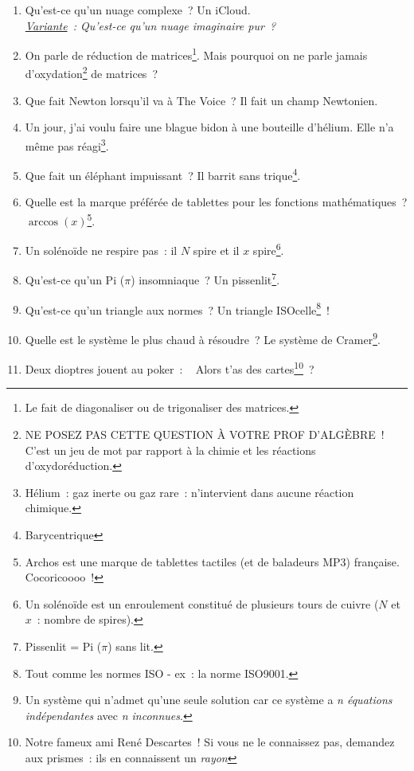 \documentclass[10pt,a5paper,fullpage]{book}
\begin{document}
\begin{enumerate}
		\item Qu’est-ce qu’un nuage complexe~? Un iCloud. \\\textit{\underline{Variante}~: Qu’est-ce qu’un nuage imaginaire pur~?}
		\item On parle de réduction de matrices\footnote{Le fait de diagonaliser ou de trigonaliser des matrices.}. Mais pourquoi on ne parle jamais d’oxydation\footnote{NE POSEZ PAS CETTE QUESTION À VOTRE PROF D’ALGÈBRE~! C’est un jeu de mot par rapport à la chimie et les réactions d’oxydoréduction.} de matrices~?
		\item Que fait Newton lorsqu’il va à The Voice~? Il fait un champ Newtonien.
		\item Un jour, j’ai voulu faire une blague bidon à une bouteille d’hélium. Elle n’a même pas réagi\footnote{Hélium~: gaz inerte ou gaz rare~: n’intervient dans aucune réaction chimique.}.
		\item Que fait un éléphant impuissant~? Il barrit sans trique\footnote{Barycentrique}.
		\item Quelle est la marque préférée de tablettes pour les fonctions mathématiques~? $\arccos(x)$\footnote{Archos est une marque de tablettes tactiles (et de baladeurs MP3) française. Cocoricoooo~!}.
		\item Un solénoïde ne respire pas~: il $N$ spire et il $x$ spire\footnote{Un solénoïde est un enroulement constitué de plusieurs tours de cuivre ($N$ et $x$~: nombre de spires).}. 
		\item Qu’est-ce qu’un Pi ($\pi$) insomniaque~? Un pissenlit\footnote{Pissenlit = Pi ($\pi$) sans lit.}.
		\item Qu’est-ce qu’un triangle aux normes~? Un triangle ISOcelle\footnote{Tout comme les normes ISO - ex~: la norme ISO9001.}~!
		\item Quelle est le système le plus chaud à résoudre~? Le système de Cramer\footnote{Un système qui n’admet qu’une seule solution car ce système a \textit{n équations indépendantes} avec \textit{n inconnues}.}.
		\item Deux dioptres jouent au poker~: \guillemotleft~ Alors t’as des cartes\footnote{Notre fameux ami René Descartes~! Si vous ne le connaissez pas, demandez aux prismes~: ils en connaissent un \textit{rayon}}~?~\guillemotright

\end{enumerate}
\end{document}
